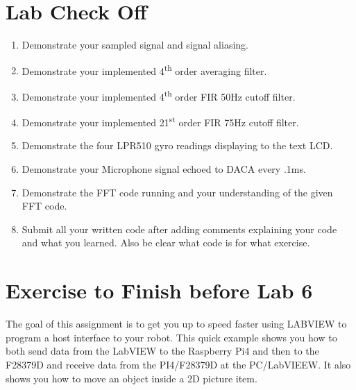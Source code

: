 \documentclass[11pt]{article}
\begin{document}
\section*{Lab Check Off}
%
\begin{enumerate}
    \item Demonstrate your sampled signal and signal aliasing.
    \item Demonstrate your implemented 4\textsuperscript{th} order averaging filter.
    \item Demonstrate your implemented 4\textsuperscript{th} order FIR 50Hz cutoff filter.
    \item Demonstrate your implemented 21\textsuperscript{st} order FIR 75Hz cutoff filter.
    \item Demonstrate the four LPR510 gyro readings displaying to the text LCD.
    \item Demonstrate your Microphone signal echoed to DACA every .1ms.
    \item Demonstrate the FFT code running and your understanding of the given FFT code.
    \item Submit all your written code after adding comments explaining your code and what you learned. Also be clear what code is for what exercise.
\end{enumerate}
%
\section*{Exercise to Finish before Lab 6}

The goal of this assignment is to get you up to speed faster using LABVIEW to program a host interface to your robot. This quick example shows you how to both send data from the LabVIEW to the Raspberry Pi4 and then to the F28379D and receive data from the PI4/F28379D at the PC/LabVIEEW. It also shows you how to move an object inside a 2D picture item.
\end{document}
